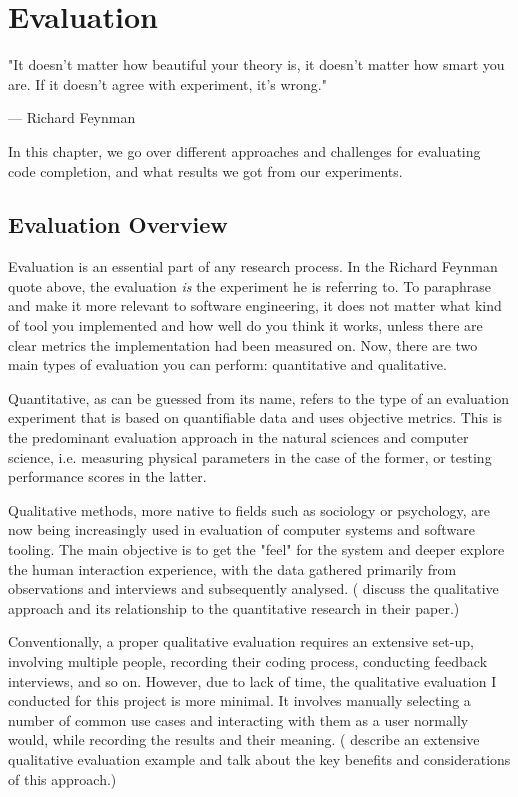 \chapter{Evaluation}
\label{chap:Evaluation}

\epigraph{"It doesn't matter how beautiful your theory is, it doesn't matter how smart you are. If it doesn't agree with experiment, it's wrong."}{--- \textup{Richard Feynman}}

In this chapter, we go over different approaches and challenges for evaluating code completion, and what results we got from our experiments.

\section{Evaluation Overview}
\label{sec:Evaluation-Overview}
Evaluation is an essential part of any research process. In the Richard Feynman quote above, the evaluation \textit{is} the experiment he is referring to. To paraphrase and make it more relevant to software engineering, it does not matter what kind of tool you implemented and how well do you think it works, unless there are clear metrics the implementation had been measured on. Now, there are two main types of evaluation you can perform: quantitative and qualitative.

Quantitative, as can be guessed from its name, refers to the type of an evaluation experiment that is based on quantifiable data and uses objective metrics. This is the predominant evaluation approach in the natural sciences and computer science, i.e. measuring physical parameters in the case of the former, or testing performance scores in the latter.

Qualitative methods, more native to fields such as sociology or psychology, are now being increasingly used in evaluation of computer systems and software tooling. The main objective is to get the "feel" for the system and deeper explore the human interaction experience, with the data gathered primarily from observations and interviews and subsequently analysed. (\cite{Hazz06a} discuss the qualitative approach and its relationship to the quantitative research in their paper.)

Conventionally, a proper qualitative evaluation requires an extensive set-up, involving multiple people, recording their coding process, conducting feedback interviews, and so on. However, due to lack of time, the qualitative evaluation I conducted for this project is more minimal. It involves manually selecting a number of common use cases and interacting with them as a user normally would, while recording the results and their meaning. (\cite{Kapl05a} describe an extensive qualitative evaluation example and talk about the key benefits and considerations of this approach.)

